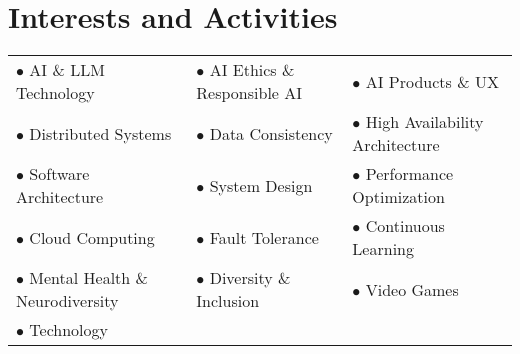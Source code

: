 
\section{Interests and Activities}

\begin{tabular}{lll}
     $\bullet$ AI \& LLM Technology & $\bullet$ AI Ethics \& Responsible AI & $\bullet$ AI Products \& UX \\
     $\bullet$ Distributed Systems & $\bullet$ Data Consistency & $\bullet$ High Availability Architecture \\
     $\bullet$ Software Architecture & $\bullet$ System Design & $\bullet$ Performance Optimization \\
     $\bullet$ Cloud Computing & $\bullet$ Fault Tolerance & $\bullet$ Continuous Learning \\
     $\bullet$ Mental Health \& Neurodiversity & $\bullet$ Diversity \& Inclusion & $\bullet$ Video Games \\
     $\bullet$ Technology & & \\
\end{tabular}
